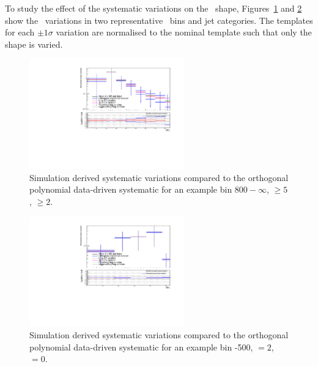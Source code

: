 To study the effect of the systematic variations on the \mht~shape, 
Figures~\ref{fig:mcCompLow} and \ref{fig:mcCompHigh} show the \mht~variations in two representative \scalht~bins 
and jet categories. The templates for each $\pm 1 \sigma$ variation are normalised to the
nominal template such that only the shape is varied.

\begin{figure}[h!]
  \centering
  \includegraphics[width=0.6\textwidth]{Figures/backgroundPrediction/mcComparison6fb/totalSMS-T1tttt_mGluino-1000_mLSP-100_25ns_mht_ge5j_ge3b_800.pdf}
  \caption{\label{fig:mcCompLow} Simulation derived systematic variations compared to the orthogonal 
  polynomial data-driven systematic for an example bin \scalht $800-\infty$, \njet $\geq 5$, \nb $\geq 2$.}
\end{figure}
\begin{figure}[h!]
  \centering
  \includegraphics[width=0.6\textwidth]{Figures/backgroundPrediction/mcComparison6fb/totalSMS-T1tttt_mGluino-1000_mLSP-100_25ns_mht_eq2j_eq0b_400.pdf}
  \caption{\label{fig:mcCompHigh} Simulation derived systematic variations compared to the 
orthogonal polynomial data-driven systematic for an example bin -500, \njet $= 2$, \nb $= 0$.}
\end{figure}

